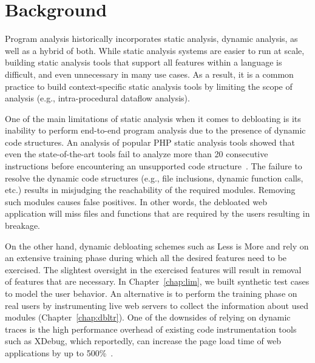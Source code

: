 \section{Background}
Program analysis historically incorporates static analysis, dynamic analysis, as well as a hybrid of both. 
While static analysis systems are easier to run at scale, building static analysis tools that support all features within a language is difficult, and even unnecessary in many use cases. 
As a result, it is a common practice to build context-specific static analysis tools by limiting the scope of analysis (e.g., intra-procedural dataflow analysis). 

One of the main limitations of static analysis when it comes to debloating is its inability to perform end-to-end program analysis due to the presence of dynamic code structures. 
An analysis of popular PHP static analysis tools showed that even the state-of-the-art tools fail to analyze more than 20 consecutive instructions before encountering an unsupported code structure~\cite{altestability}. 
The failure to resolve the dynamic code structures (e.g., file inclusions, dynamic function calls, etc.) results in misjudging the reachability of the required modules. 
Removing such modules causes false positives. 
In other words, the debloated web application will miss files and functions that are required by the users resulting in breakage. 

On the other hand, dynamic debloating schemes such as Less is More and \dbltr{} rely on an extensive training phase during which all the desired features need to be exercised. 
The slightest oversight in the exercised features will result in removal of features that are necessary. 
In Chapter~\ref{chap:lim}, we built synthetic test cases to model the user behavior. 
An alternative is to perform the training phase on real users by instrumenting live web servers to collect the information about used modules (Chapter~\ref{chap:dbltr}). 
One of the downsides of relying on dynamic traces is the high performance overhead of existing code instrumentation tools such as XDebug, which reportedly, can increase the page load time of web applications by up to 500\%~\cite{azad2019less}. 

